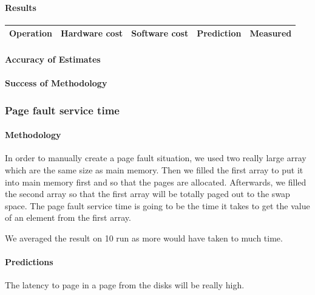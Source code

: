 \paragraph{Results}

\begin{center}
\begin{tabular}{| l | l | l | l | l |}
\hline
Operation & Hardware cost & Software cost & Prediction & Measured \\
\hline
\end{tabular}
\end{center}
\paragraph{Accuracy of Estimates}
\paragraph{Success of Methodology}




\subsubsection{Page fault service time}
\paragraph{Methodology}
In order to manually create a page fault situation, we used two really large array which are the same size as main memory.
Then we filled the first array to put it into main memory first and so that the pages are allocated.
Afterwards, we filled the second array so that the first array will be totally paged out to the swap space.
The page fault service time is going to be the time it takes to get the value of an element from the first array.

We averaged the result on 10 run as more would have taken to much time.

\paragraph{Predictions}
The latency to page in a page from the disks will be really high.

